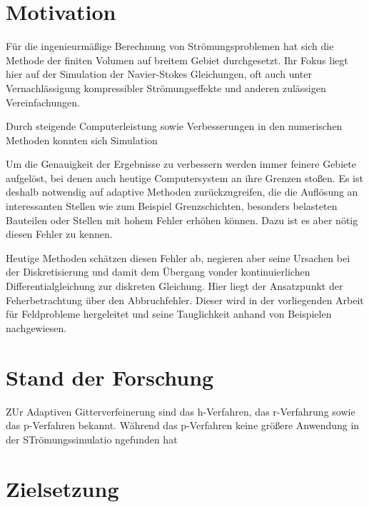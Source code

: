 \section{Motivation}
Für die ingenieurmäßige Berechnung von Strömungsproblemen hat sich die Methode der
finiten Volumen auf breitem Gebiet durchgesetzt. Ihr Fokus liegt hier auf der Simulation
der Navier-Stokes Gleichungen, oft auch unter Vernachlässigung kompressibler Strömungseffekte und
anderen zulässigen Vereinfachungen.

Durch steigende Computerleistung sowie Verbesserungen in den numerischen Methoden konnten
sich Simulation

Um die Genauigkeit der Ergebnisse zu verbessern werden immer feinere Gebiete aufgelöst,
bei denen auch heutige Computersystem an ihre Grenzen stoßen. Es ist deshalb notwendig
auf adaptive Methoden zurückzugreifen, die die Auflösung an interessanten Stellen wie
zum Beispiel Grenzschichten, besonders belasteten Bauteilen oder Stellen mit hohem Fehler
erhöhen können. Dazu ist es aber nötig diesen Fehler zu kennen.

Heutige Methoden schätzen diesen Fehler ab, negieren aber seine Ursachen bei der Diskretisierung
und damit dem Übergang vonder kontinuierlichen Differentialgleichung zur diskreten Gleichung.
Hier liegt der Ansatzpunkt der Feherbetrachtung über den Abbruchfehler. Dieser wird in der
vorliegenden Arbeit für Feldprobleme hergeleitet und seine Tauglichkeit anhand
von Beispielen nachgewiesen.

\section{Stand der Forschung}

ZUr Adaptiven Gitterverfeinerung sind das h-Verfahren, das r-Verfahrung sowie das p-Verfahren bekannt.
Während das p-Verfahren keine größere Anwendung in der STrömungssimulatio ngefunden hat



\section{Zielsetzung}
\cleardoublepage
